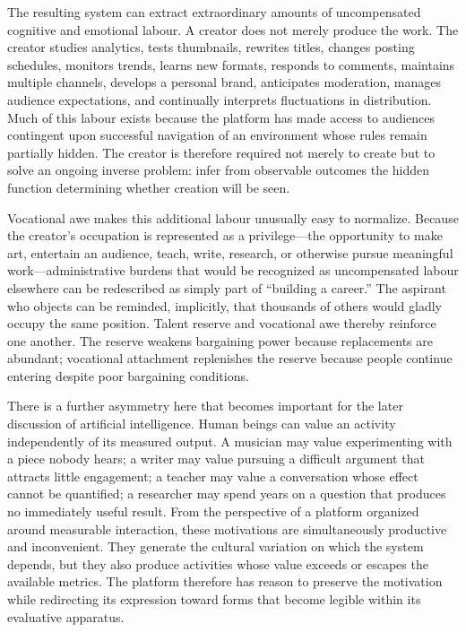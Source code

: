\documentclass[11pt]{article}
\begin{document}
The resulting system can extract extraordinary amounts of uncompensated cognitive and emotional labour. A creator does not merely produce the work. The creator studies analytics, tests thumbnails, rewrites titles, changes posting schedules, monitors trends, learns new formats, responds to comments, maintains multiple channels, develops a personal brand, anticipates moderation, manages audience expectations, and continually interprets fluctuations in distribution. Much of this labour exists because the platform has made access to audiences contingent upon successful navigation of an environment whose rules remain partially hidden. The creator is therefore required not merely to create but to solve an ongoing inverse problem: infer from observable outcomes the hidden function determining whether creation will be seen.

Vocational awe makes this additional labour unusually easy to normalize. Because the creator's occupation is represented as a privilege---the opportunity to make art, entertain an audience, teach, write, research, or otherwise pursue meaningful work---administrative burdens that would be recognized as uncompensated labour elsewhere can be redescribed as simply part of ``building a career.'' The aspirant who objects can be reminded, implicitly, that thousands of others would gladly occupy the same position. Talent reserve and vocational awe thereby reinforce one another. The reserve weakens bargaining power because replacements are abundant; vocational attachment replenishes the reserve because people continue entering despite poor bargaining conditions.

There is a further asymmetry here that becomes important for the later discussion of artificial intelligence. Human beings can value an activity independently of its measured output. A musician may value experimenting with a piece nobody hears; a writer may value pursuing a difficult argument that attracts little engagement; a teacher may value a conversation whose effect cannot be quantified; a researcher may spend years on a question that produces no immediately useful result. From the perspective of a platform organized around measurable interaction, these motivations are simultaneously productive and inconvenient. They generate the cultural variation on which the system depends, but they also produce activities whose value exceeds or escapes the available metrics. The platform therefore has reason to preserve the motivation while redirecting its expression toward forms that become legible within its evaluative apparatus.
\end{document}
